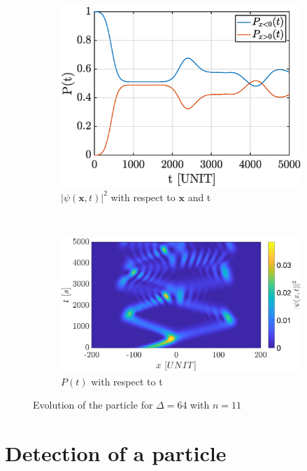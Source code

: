 \documentclass[a4paper,12pt,twoside]{article}
\newcommand{\mbf}[1]{\mathbf{#1}} %
\begin{document}
\begin{figure}[h]
  \centering
  \begin{subfigure}[t]{0.45\textwidth}
    \includegraphics[width=\textwidth]{graphs/iii_findn_prob.eps}
    \caption{$|\psi(\mbf{x}, t)|^2$ with respect to $\mbf{x}$ and t}
    \label{fig:iii_findn_prob}
  \end{subfigure}
  ~
  \begin{subfigure}[t]{0.45\textwidth}
    \includegraphics[width=\textwidth]{graphs/iii_findn_psi.eps}
    \caption{$P(t)$ with respect to t}
    \label{fig:iii_findn_psi}
  \end{subfigure}
  \caption{Evolution of the particle for $\Delta = 64$ with $n=11$}
  \label{fig:iii_findn}
\end{figure}



\section{Detection of a particle}





\end{document}
